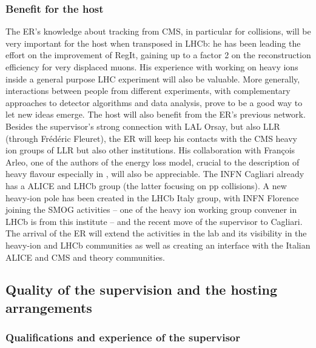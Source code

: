 \documentclass[a4paper,11pt]{article}
\newcommand{\ER}{ER\xspace}
\newcommand{\supervisor}{the supervisor\xspace}
\begin{document}
\subsubsection{Benefit for the host}

The \ER's knowledge about tracking from CMS, in particular for \pbpb collisions, will be very important for the host when transposed in LHCb: he has been leading the effort on the improvement of RegIt, gaining up to a factor 2 on the reconstruction efficiency for very displaced muons. His experience with working on heavy ions inside a general purpose LHC experiment will also be valuable. More generally, interactions between people from different experiments, with complementary approaches to detector algorithms and data analysis, prove to be a good way to let new ideas emerge. 
%
The host will also benefit from the \ER's previous network. Besides \supervisor's strong connection with LAL Orsay, but also LLR (through Frédéric Fleuret), the \ER will keep his contacts with the CMS heavy ion groups of LLR but also other institutions. His collaboration with François Arleo, one of the authors of the energy loss model, crucial to the description of heavy flavour especially in \ppb, will also be appreciable.
%
The INFN Cagliari already has a ALICE and LHCb group (the latter
focusing on pp collisions). A new heavy-ion pole has been created in the
LHCb Italy group, with INFN Florence joining the SMOG activities -- one 
of the heavy ion working group convener in LHCb is from this institute --
and the recent move of \supervisor to Cagliari. The arrival of the 
\ER will extend the activities in the lab and its visibility in
the heavy-ion and LHCb communities as well as creating an
interface with the Italian ALICE and CMS and theory communities.



%           

\subsection{Quality of the supervision and the hosting arrangements} 
\label{sec:supervision}

\subsubsection{Qualifications and experience of the supervisor}

% 
\end{document}
